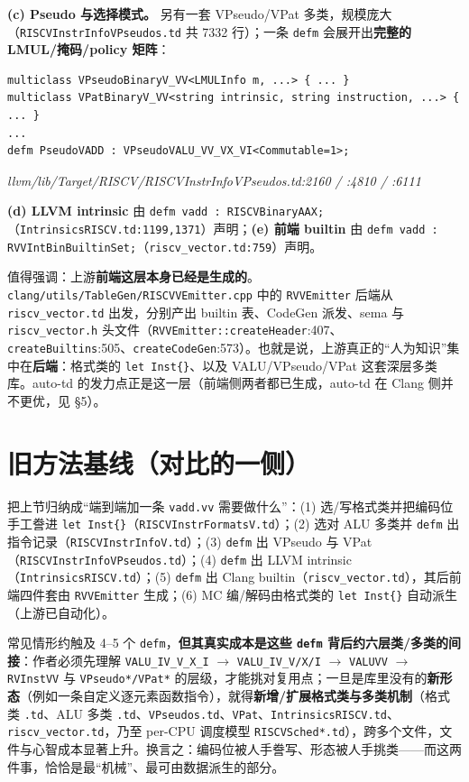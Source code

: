 \documentclass[11pt,UTF8,fontset=none]{ctexart}
\newcommand{\fcite}[1]{{\footnotesize\itshape\textcolor{framegray}{#1}}}
\begin{document}
\textbf{(c) Pseudo 与选择模式。} 另有一套 VPseudo/VPat 多类，规模庞大（\texttt{RISCVInstrInfoVPseudos.td} 共 7332 行）；一条 \texttt{defm} 会展开出\textbf{完整的 LMUL/掩码/policy 矩阵}：
\begin{lstlisting}
multiclass VPseudoBinaryV_VV<LMULInfo m, ...> { ... }
multiclass VPatBinaryV_VV<string intrinsic, string instruction, ...> { ... }
...
defm PseudoVADD : VPseudoVALU_VV_VX_VI<Commutable=1>;
\end{lstlisting}
\fcite{llvm/lib/Target/RISCV/RISCVInstrInfoVPseudos.td:2160 / :4810 / :6111}

\textbf{(d) LLVM intrinsic} 由 \texttt{defm vadd : RISCVBinaryAAX;}（\texttt{IntrinsicsRISCV.td:1199,1371}）声明；\textbf{(e) 前端 builtin} 由 \texttt{defm vadd : RVVIntBinBuiltinSet;}（\texttt{riscv\_vector.td:759}）声明。

值得强调：上游\textbf{前端这层本身已经是生成的}。\texttt{clang/utils/TableGen/RISCVVEmitter.cpp} 中的 \texttt{RVVEmitter} 后端从 \texttt{riscv\_vector.td} 出发，分别产出 builtin 表、CodeGen 派发、sema 与 \texttt{riscv\_vector.h} 头文件（\texttt{RVVEmitter::createHeader}:407、\texttt{createBuiltins}:505、\texttt{createCodeGen}:573）。也就是说，上游真正的“人为知识”集中在\textbf{后端}：格式类的 \texttt{let Inst\{\}}、以及 VALU/VPseudo/VPat 这套深层多类库。auto-td 的发力点正是这一层（前端侧两者都已生成，auto-td 在 Clang 侧并不更优，见 §5）。

\section{旧方法基线（对比的一侧）}
把上节归纳成“端到端加一条 \texttt{vadd.vv} 需要做什么”：(1) 选/写格式类并把编码位手工誊进 \texttt{let Inst\{\}}（\texttt{RISCVInstrFormatsV.td}）；(2) 选对 ALU 多类并 \texttt{defm} 出指令记录（\texttt{RISCVInstrInfoV.td}）；(3) \texttt{defm} 出 VPseudo 与 VPat（\texttt{RISCVInstrInfoVPseudos.td}）；(4) \texttt{defm} 出 LLVM intrinsic（\texttt{IntrinsicsRISCV.td}）；(5) \texttt{defm} 出 Clang builtin（\texttt{riscv\_vector.td}），其后前端四件套由 \texttt{RVVEmitter} 生成；(6) MC 编/解码由格式类的 \texttt{let Inst\{\}} 自动派生（上游已自动化）。

常见情形约触及 4–5 个 \texttt{defm}，\textbf{但其真实成本是这些 \texttt{defm} 背后约六层类/多类的间接}：作者必须先理解 \texttt{VALU\_IV\_V\_X\_I} $\to$ \texttt{VALU\_IV\_V/X/I} $\to$ \texttt{VALUVV} $\to$ \texttt{RVInstVV} 与 \texttt{VPseudo*/VPat*} 的层级，才能挑对复用点；一旦是库里没有的\textbf{新形态}（例如一条自定义逐元素函数指令），就得\textbf{新增/扩展格式类与多类机制}（格式类 \texttt{.td}、ALU 多类 \texttt{.td}、\texttt{VPseudos.td}、\texttt{VPat}、\texttt{IntrinsicsRISCV.td}、\texttt{riscv\_vector.td}，乃至 per-CPU 调度模型 \texttt{RISCVSched*.td}），跨多个文件，文件与心智成本显著上升。换言之：编码位被人手誊写、形态被人手挑类——而这两件事，恰恰是最“机械”、最可由数据派生的部分。
\end{document}
